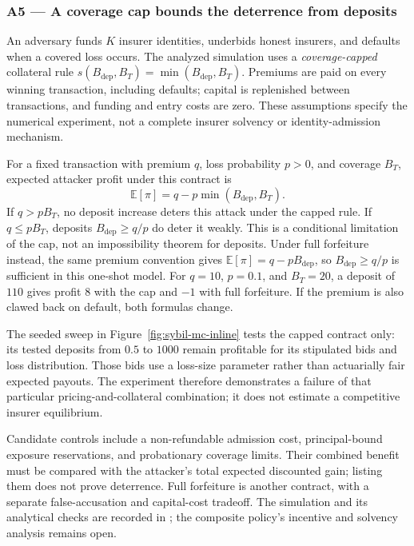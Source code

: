 \documentclass[11pt,a4paper]{article}
\theoremstyle{definition}
\theoremstyle{remark}
\begin{document}
\subsubsection{A5 --- A coverage cap bounds the deterrence from deposits}\label{sec:youle:a5}

An adversary funds $K$ insurer identities, underbids honest insurers, and
defaults when a covered loss occurs. The analyzed simulation uses a
\emph{coverage-capped} collateral rule
$s(B_{\mathrm{dep}},B_T)=\min(B_{\mathrm{dep}},B_T)$.
Premiums are paid on every winning transaction, including defaults; capital
is replenished between transactions, and funding and entry costs are zero.
These assumptions specify the numerical experiment, not a complete insurer
solvency or identity-admission mechanism.



For a fixed transaction with premium $q$, loss probability $p>0$, and
coverage $B_T$, expected attacker profit under this contract is
\[
 \mathbb E[\pi]=q-p\min(B_{\mathrm{dep}},B_T).
\]
If $q>pB_T$, no deposit increase deters this attack under the capped rule.
If $q\le pB_T$, deposits $B_{\mathrm{dep}}\ge q/p$ do deter it weakly.
This is a conditional limitation of the cap, not an impossibility theorem
for deposits. Under full forfeiture instead, the same premium convention
gives $\mathbb E[\pi]=q-pB_{\mathrm{dep}}$, so $B_{\mathrm{dep}}\ge q/p$
is sufficient in this one-shot model. For $q=10$, $p=0.1$, and $B_T=20$,
a deposit of $110$ gives profit $8$ with the cap and $-1$ with full forfeiture.
If the premium is also clawed back on default, both formulas change.

The seeded sweep in Figure~\ref{fig:sybil-mc-inline} tests the capped
contract only: its tested deposits from $0.5$ to $1000$ remain profitable
for its stipulated bids and loss distribution. Those bids use a loss-size
parameter rather than actuarially fair expected payouts. The experiment
therefore demonstrates a failure of that particular pricing-and-collateral
combination; it does not estimate a competitive insurer equilibrium.



Candidate controls include a non-refundable admission cost, principal-bound
exposure reservations, and probationary coverage limits. Their combined
benefit must be compared with the attacker's total expected discounted gain;
listing them does not prove deterrence. Full forfeiture is another contract,
with a separate false-accusation and capital-cost tradeoff. The simulation
and its analytical checks are recorded in
; the composite policy's
incentive and solvency analysis remains open.
\end{document}
